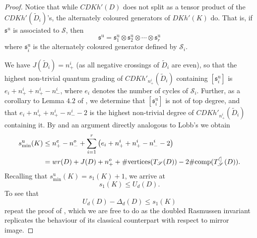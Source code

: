 \documentclass[10pt,oneside]{amsart}
\theoremstyle{definition}
\numberwithin{equation}{section}
\begin{document}
\begin{proof}
	Notice that while \( {CDKh} ' ( D ) \) does not split as a tensor product of the \( {CDKh} ' ( \widetilde{D}_i ) \)'s, the alternately coloured generators of \( {DKh} ' ( K ) \) do. That is, if \( {\mathfrak{s}}^u \) is associated to \( \mathscr{S} \), then
		\begin{equation}
		\label{Eq:acgensplit}
			{\mathfrak{s}}^{\text{u}} = {\mathfrak{s}}^{\text{u}}_1 \otimes {\mathfrak{s}}^{\text{u}}_2 \otimes \cdots \otimes {\mathfrak{s}}^{\text{u}}_r
		\end{equation}
	where \( {\mathfrak{s}}^{\text{u}}_i \) is the alternately coloured generator defined by \( \mathscr{S}_i \).
	
	We have \( J ( \widetilde{D}_i ) = n^i_+ \) (as all negative crossings of \( \widetilde{D}_i \) are even), so that the highest non-trivial quantum grading of \( {{CDKh} '}_{n^i_+} ( \widetilde{D}_i ) \) containing \( \left[ {\mathfrak{s}}^{\text{u}}_i \right] \) is \( e_i + n^i_+ + n^i_+ - n^i_- \), where \( e_i \) denotes the number of cycles of \( \mathscr{S}_i \). Further, as a corollary to Lemma \(4.2\) of \cite{Rushworth2017}, we determine that \( \left[ {\mathfrak{s}}^{\text{u}}_i \right] \) is not of top degree, and that \( e_i + n^i_+ + n^i_+ - n^i_- - 2 \) is the highest non-trivial degree of \( {{CDKh} '}_{n^i_+} ( \widetilde{D}_i ) \) containing it. By  and an argument directly analogous to Lobb's \cite{Lobb2011} we obtain
		\begin{equation*}
			\begin{aligned}
				s^{\text{u}}_{\text{min}} ( K ) &\leq n^e_+ - n^o_- + \sum_{i=1}^{r} \left( e_i + n^i_+ + n^i_+ - n^i_- - 2 \right) \\
				&= wr ( D ) + J ( D ) + n^o_+ + \# \text{vertices} ( T_{\mathscr{S}} ( D ) ) - 2 \# \text{comp} ( T^{\Leftcircle}_{\mathscr{S}} ( D ) ).
			\end{aligned}
		\end{equation*}
	Recalling that \( s^{\text{u}}_{\text{min}} ( K ) = s_1 ( K ) + 1 \), we arrive at 
		\begin{equation*}
			s_1 ( K ) \leq U_d ( D ).
		\end{equation*}
	To see that
		\begin{equation*}
			U_d ( D ) - \Delta_d ( D ) \leq s_1 ( K ) 
		\end{equation*}
	repeat the proof of , which we are free to do as the doubled Rasmussen invariant replicates the behaviour of its classical counterpart with respect to mirror image.
\end{proof}
\end{document}
